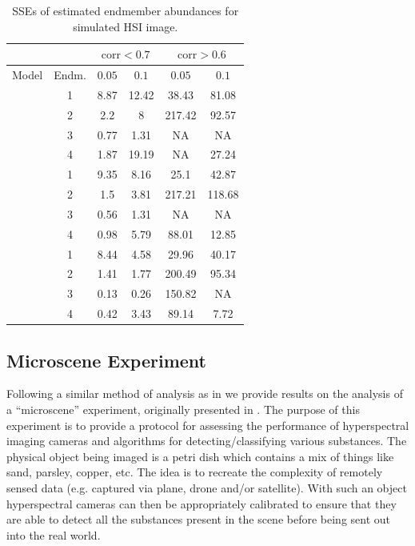 \documentclass{article}
\numberwithin{equation}{section}
\theoremstyle{plain}
\begin{document}
\begin{table}
\begin{center}
\renewcommand{\arraystretch}{0.9}
\begin{tabular}{|c|c|c|c|c|c|}
\hline
 & & \multicolumn{2}{|c|}{$\mbox{corr} < 0.7$} &
 \multicolumn{2}{|c|}{$\mbox{corr} > 0.6$}\\
\hline
Model & Endm. & $0.05$ & $0.1$ & $0.05$ & $0.1$ \\
\hhline{|=|=|=|=|=|=|}
\multirow{4}{*}{GL} 
&	1	&	8.87	&	12.42	&	38.43	&	81.08	\\
&	2	&	2.2	&	8	&	217.42	&	92.57	\\
&	3	&	0.77	&	1.31	&	NA	&	NA	\\
&	4	&	1.87	&	19.19	&	NA	&	27.24	\\
\hhline{|=|=|=|=|=|=|}
\multirow{4}{*}{SGL} 
&	1	&	9.35	&	8.16	&	25.1	&	42.87	\\
&	2	&	1.5	&	3.81	&	217.21	&	118.68	\\
&	3	&	0.56	&	1.31	&	NA	&	NA	\\
&	4	&	0.98	&	5.79	&	88.01	&	12.85	\\
\hhline{|=|=|=|=|=|=|}
\multirow{4}{*}{SSGL} 
&	1	&	8.44	&	4.58	&	29.96	&	40.17	\\
&	2	&	1.41	&	1.77	&	200.49	&	95.34	\\
&	3	&	0.13	&	0.26	&	150.82	&	NA	\\
&	4	&	0.42	&	3.43	&	89.14	&	7.72	\\
\hline
\end{tabular}
\caption{SSEs of estimated endmember abundances for
simulated HSI image.}
\label{TAB:HSI_RES}
\end{center}
\end{table}


\subsection{Microscene Experiment}
Following a similar method of analysis as in \cite{sgen2014} we provide results
on the analysis of a ``microscene'' experiment, originally presented in
\cite{allen2013}. The purpose of this experiment is to provide a protocol for
assessing the performance of hyperspectral imaging cameras and algorithms for
detecting/classifying various substances. The physical object being imaged is a
petri dish which contains a mix of things like sand, parsley, copper, etc. The
idea is to recreate the complexity of remotely sensed data (e.g. captured via
plane, drone and/or satellite). With such an object hyperspectral cameras can
then be appropriately calibrated to ensure that they are able to detect all the
substances present in the scene before being sent out into the real world.
\end{document}
